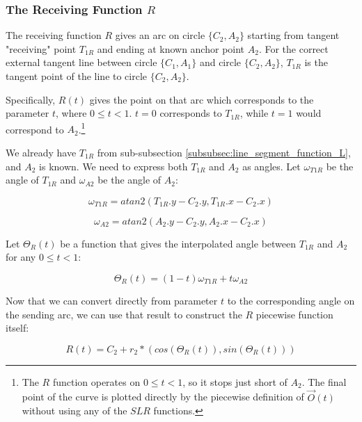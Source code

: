 \documentclass{article}
\begin{document}
\subsubsection{The Receiving Function $R$}
The receiving function $R$ gives an arc on circle $\{C_2, A_2\}$ starting from tangent "receiving" point $T_{1R}$ and ending at known anchor point $A_2$. For the correct external tangent line between circle $\{C_1, A_1\}$ and circle $\{C_2, A_2\}$, $T_{1R}$ is the tangent point of the line to circle $\{C_2, A_2\}$. 

Specifically, $R(t)$ gives the point on that arc which corresponds to the parameter $t$, where $0 \leq t < 1$. $t = 0$ corresponds to $T_{1R}$, while $t = 1$ would correspond to $A_{2}$.\footnote{The $R$ function operates on $0 \leq t < 1$, so it stops just short of $A_2$. The final point of the curve is plotted directly by the piecewise definition of $\overrightarrow{O}(t)$ without using any of the $SLR$ functions. }

We already have $T_{1R}$ from sub-subsection \ref{subsubsec:line_segment_function_L}, and $A_2$ is known. We need to express both $T_{1R}$ and $A_2$ as angles. Let $\omega_{T1R}$ be the angle of $T_{1R}$ and $\omega_{A2}$ be the angle of $A_2$:

\begin{equation}
    \label{eq:omega_T1R}
    \omega_{T1R} = atan2(T_{1R}.y - C_2.y, T_{1R}.x - C_2.x)
\end{equation}

\begin{equation}
    \label{eq:omega_A2}
    \omega_{A2} = atan2(A_2.y - C_2.y, A_2.x - C_2.x)
\end{equation}

Let $\Theta_R(t)$ be a function that gives the interpolated angle between $T_{1R}$ and $A_2$ for any $0 \leq t < 1$:

\begin{equation}
    \label{eq:Theta_R(t)}
    \Theta_R(t) = (1-t) \omega_{T1R} + t \omega_{A2}
\end{equation}

Now that we can convert directly from parameter $t$ to the corresponding angle on the sending arc, we can use that result to construct the $R$ piecewise function itself:

\begin{equation}
    \label{eq:R(t)}
    R(t) = C_2 + r_2 * (cos( \Theta_R(t) ), sin( \Theta_R(t) ))
\end{equation} 
\end{document}

